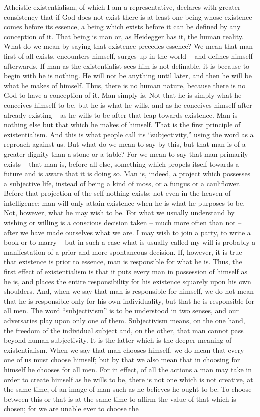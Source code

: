 \documentclass[12pt]{article}
\begin{document}
Atheistic existentialism, of which I am a representative, declares with greater consistency that if God does not exist there is at least one being whose existence comes before its essence, a being which exists before it can be defined by any conception of it. That being is man or, as Heidegger has it, the human reality. What do we mean by saying that existence precedes essence? We mean that man first of all exists, encounters himself, surges up in the world – and defines himself afterwards. If man as the existentialist sees him is not definable, it is because to begin with he is nothing. He will not be anything until later, and then he will be what he makes of himself. Thus, there is no human nature, because there is no God to have a conception of it. Man simply is. Not that he is simply what he conceives himself to be, but he is what he wills, and as he conceives himself after already existing – as he wills to be after that leap towards existence. Man is nothing else but that which he makes of himself. That is the first principle of existentialism. And this is what people call its “subjectivity,” using the word as a reproach against us. But what do we mean to say by this, but that man is of a greater dignity than a stone or a table? For we mean to say that man primarily exists – that man is, before all else, something which propels itself towards a future and is aware that it is doing so. Man is, indeed, a project which possesses a subjective life, instead of being a kind of moss, or a fungus or a cauliflower. Before that projection of the self nothing exists; not even in the heaven of intelligence: man will only attain existence when he is what he purposes to be. Not, however, what he may wish to be. For what we usually understand by wishing or willing is a conscious decision taken – much more often than not – after we have made ourselves what we are. I may wish to join a party, to write a book or to marry – but in such a case what is usually called my will is probably a manifestation of a prior and more spontaneous decision. If, however, it is true that existence is prior to essence, man is responsible for what he is. Thus, the first effect of existentialism is that it puts every man in possession of himself as he is, and places the entire responsibility for his existence squarely upon his own shoulders. And, when we say that man is responsible for himself, we do not mean that he is responsible only for his own individuality, but that he is responsible for all men. The word “subjectivism” is to be understood in two senses, and our adversaries play upon only one of them. Subjectivism means, on the one hand, the freedom of the individual subject and, on the other, that man cannot pass beyond human subjectivity. It is the latter which is the deeper meaning of existentialism. When we say that man chooses himself, we do mean that every one of us must choose himself; but by that we also mean that in choosing for himself he chooses for all men. For in effect, of all the actions a man may take in order to create himself as he wills to be, there is not one which is not creative, at the same time, of an image of man such as he believes he ought to be. To choose between this or that is at the same time to affirm the value of that which is chosen; for we are unable ever to choose the 
\end{document}

